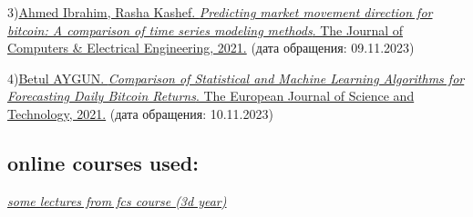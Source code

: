 \documentclass[12pt,a4paper]{article}
\begin{document}
3)\href{https://www.sciencedirect.com/science/article/abs/pii/S0045790620307576}{Ahmed Ibrahim, Rasha Kashef. \emph{Predicting market movement direction for bitcoin: A comparison of time series modeling methods}. The Journal of Computers \& Electrical Engineering, 2021.} (дата обращения: 09.11.2023)

    

4)\href{https://www.sciencedirect.com/science/article/abs/pii/S0045790620307576}{Betul AYGUN. \emph{Comparison of Statistical and Machine Learning Algorithms for Forecasting Daily Bitcoin Returns}. The European Journal of Science and Technology, 2021.} (дата обращения: 10.11.2023)

\subsection{online courses used:}

\href{http://wiki.cs.hse.ru/Time_series_modelling_22_23}{\emph{some lectures from fcs course (3d year)}}
\end{document}
